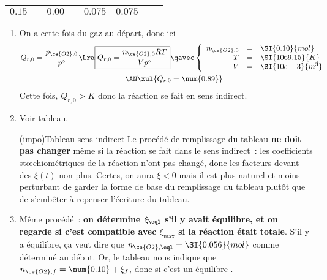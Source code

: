 \documentclass[../TDTM2.tex]{subfiles}%
\begin{document}
{\begin{center}
\begin{tabularx}{\linewidth}{|l|c||YdYdY||Y|}
			$\num{0.15}$         & \vline               &
			$\num{0.00}$         & \vline               &
			$\num{0.075}$        &
			$\num{0.075}$                                 \\
			\hline
		\end{tabularx}
	\end{center}
	\begin{enumerate}[leftmargin=20pt, label=\alph* --]
		\item On a cette fois du gaz au départ, donc ici
		      \begin{gather*}
			      Q_{r,0}
			      = \frac{p_{\ce{O2}, 0}}{p^\circ}
			      \Lra
			      \boxed{
				      Q_{r,0}
				      = \frac{n_{\ce{O2}, 0}RT}{Vp^\circ}
			      }
			      \qavec
			      \left\{
			      \begin{array}{rcl}
				      n_{\ce{O2}, 0} & = & \SI{0.10}{mol}  \\
				      T              & = & \SI{1069.15}{K} \\
				      V              & = & \SI{10e-3}{m^3}
			      \end{array}
			      \right.\\
			      \AN
			      \xul{Q_{r,0} = \num{0.89}}
		      \end{gather*}
		      Cette fois, $Q_{r,0} > K$ donc la réaction se fait en sens
		      indirect.
		\item Voir tableau.
		      \begin{tcb}(impo){Tableau sens indirect}
			      Le procédé de remplissage du tableau \textbf{ne doit pas changer}
			      même si la réaction se fait dans le sens indirect~: les coefficients
			      stœchiométriques de la réaction n'ont pas changé, donc les facteurs
			      devant des $\xi(t)$ non plus.
			      \smallbreak
			      Certes, on aura $\xi < 0$ mais il est plus naturel et moins
			      perturbant de garder la forme de base du remplissage du tableau
			      plutôt que de s'embêter à repenser l'écriture du tableau.
		      \end{tcb}
		\item Même procédé~: \textbf{on détermine $\xi_{\eql}$ s'il y
			      avait équilibre, et on regarde si c'est compatible avec
			      $\xi_{\max}$ si la réaction était totale}.
		      \bigbreak
		      S'il y a équilibre, ça veut dire que $n_{\ce{O2}, \eql} =
			      \SI{0.056}{mol}$ comme déterminé au début. Or, le tableau nous
		      indique que $n_{\ce{O2}, f} = \num{0.10} + \xi_f$, donc si c'est
		      un équilibre .

\end{enumerate}}
\end{document}
